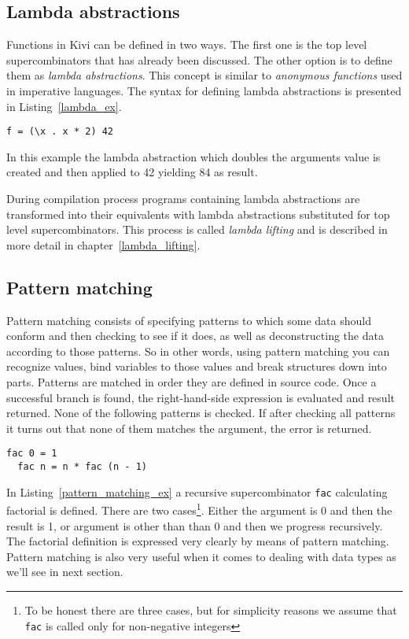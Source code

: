 \documentclass[a4paper]{report}
\begin{document}
\subsection{Lambda abstractions}
Functions in Kivi can be defined in two ways. The first one is the top level
supercombinators that has already been discussed. The other option is to define
them as \textit{lambda abstractions}. This concept is similar to \textit{anonymous
functions} used in imperative languages. The syntax for defining lambda
abstractions is presented in Listing~\ref{lambda_ex}.

\begin{lstlisting}[label=lambda_ex,caption={Lambda abstraction}]
  f = (\x . x * 2) 42
\end{lstlisting}

In this example the lambda abstraction which doubles the arguments value is
created and then applied to 42 yielding 84 as result.

During compilation process programs containing lambda abstractions are
transformed into their equivalents with lambda abstractions substituted for top
level supercombinators. This process is called \textit{lambda lifting} and is
described in more detail in chapter~\ref{lambda_lifting}.

\subsection{Pattern matching}

Pattern matching consists of specifying patterns to which some data should
conform and then checking to see if it does, as well as deconstructing the data
according to those patterns. So in other words, using pattern matching you can
recognize values, bind variables to those values and break structures down into
parts.
Patterns are matched in order they are defined in source code. Once a
successful branch is found, the right-hand-side expression is evaluated and
result returned. None of the following patterns is checked. If after checking
all patterns it turns out that none of them matches the argument, the error is
returned.

\begin{lstlisting}[label=pattern_matching_ex,caption={Factorial using pattern matching.}]
  fac 0 = 1
  fac n = n * fac (n - 1)
\end{lstlisting}

In Listing~\ref{pattern_matching_ex} a recursive supercombinator \texttt{fac}
calculating factorial is defined. There are two cases\footnote{To be honest
there are three cases, but for simplicity reasons we assume that
\texttt{fac} is called only for non-negative integers}. Either the
argument is 0 and then the result is 1, or argument is other than than 0 and
then we progress recursively. The factorial definition is expressed very
clearly by means of pattern matching.
Pattern matching is also very useful when it comes to dealing with data
types as we'll see in next section.
\end{document}
